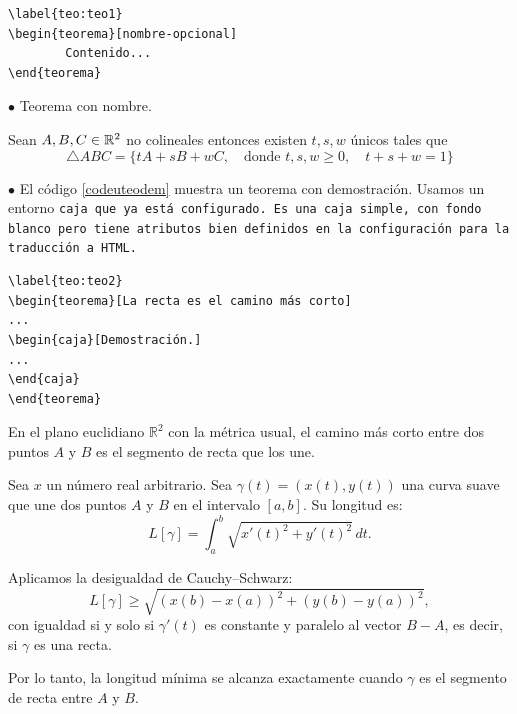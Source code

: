 \documentclass[fleqn,oneside]{article}
\begin{document}
%
\bigskip\begin{lstlisting}[caption={Un teorema},label={codeuteo}]
\label{teo:teo1}
\begin{teorema}[nombre-opcional]
		Contenido...
\end{teorema}
\end{lstlisting}
%

\bigskip
$\bullet$\; Teorema con nombre.\\


\label{teo:teo1}
\begin{teorema}
Sean $A,B,C \in \mathbb{R}^2$ no colineales entonces existen $t,s,w$ únicos tales que
$$\triangle ABC=
\{t A + s B + w C,
\quad \text{donde } t,s,w\geq 0, \quad
t+s+w = 1\}
$$
\end{teorema}

\bigskip
$\bullet$\; El código \ref{codeuteodem} muestra un teorema con demostración. Usamos  un entorno \tt{caja} que ya está configurado. Es una caja simple, con fondo blanco pero tiene atributos bien definidos en la configuración para la  traducción a HTML.\\


\bigskip
\bigskip\begin{lstlisting}[caption={Un teorema con demostración},label={codeuteodem}]
\label{teo:teo2}
\begin{teorema}[La recta es el camino más corto]
...
\begin{caja}[Demostración.]
...
\end{caja}
\end{teorema}
\end{lstlisting}


\bigskip
\label{teo:teo2}
\begin{teorema}
En el plano euclidiano $\mathbb{R}^2$ con la métrica usual, el camino más corto entre dos puntos $A$ y $B$ es el segmento de recta que los une.
%
\begin{caja}[Demostración]
Sea \(x\) un número real arbitrario.
Sea $\gamma(t) = (x(t), y(t))$ una curva suave que une dos puntos $A$ y $B$ en el intervalo $[a, b]$. Su longitud es:
\[
L[\gamma] = \int_a^b \sqrt{x'(t)^2 + y'(t)^2}\, dt.
\]

Aplicamos la desigualdad de Cauchy–Schwarz:
\[
L[\gamma] \geq \sqrt{(x(b) - x(a))^2 + (y(b) - y(a))^2},
\]
con igualdad si y solo si $\gamma'(t)$ es constante y paralelo al vector $B - A$, es decir, si $\gamma$ es una recta.

Por lo tanto, la longitud mínima se alcanza exactamente cuando $\gamma$ es el segmento de recta entre $A$ y $B$.\hfill\qedsymbol
\end{caja}
%
\end{teorema}
\end{document}
